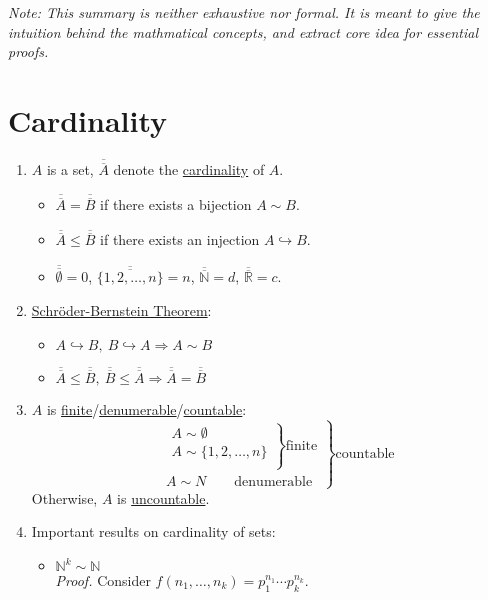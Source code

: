 \documentclass[%
 aip,
 jmp,%
 amsmath,amssymb,
 reprint,%
]{revtex4-1}
\def\R{{\mathbb R}}
\def\N{{\mathbb N}}
\renewenvironment{proof}{\color{gray}\footnotesize\emph{Proof.}}{}
\newcommand{\imply}{\Rightarrow}
\newcommand{\defn}[1]{\underline{#1}}
\newcommand{\card}[1]{\overline{\overline{#1}}}
\newcommand{\inject}{\hookrightarrow}
\begin{document}
\emph{Note: This summary is neither exhaustive nor formal.
It is meant to give the intuition behind the mathmatical concepts, and
extract core idea for essential proofs.}

\section{Cardinality}
\begin{enumerate}
  \item $A$ is a set, $\card{A}$ denote the \defn{cardinality} of $A$.
      \begin{itemize}
        \item $\card{A} = \card{B}$ if there exists a bijection $A \sim B$.
        \item $\card{A} \le \card{B}$ if there exists an injection $A \inject B$.
        \item $\card{\emptyset}=0$, $\card{\{1,2,\dots,n\}}=n$, $\card{\N}=d$, $\card{\R}=c$.
      \end{itemize}

  \item \defn{Schr\"oder-Bernstein Theorem}:
    \begin{itemize}
      \item $A \inject B,\ B \inject A \imply A \sim B$
      \item $\card{A} \le \card{B},\ \card{B} \le \card{A} \imply \card{A} = \card{B}$
    \end{itemize}

  \item $A$ is \defn{finite}/\defn{denumerable}/\defn{countable}:
  $$\left.
      \begin{align*}
         &\left.
          \begin{align*}
             A \sim \emptyset \\
             A \sim \{ 1,2,\dots,n \}\\
          \end{align*}
         \right\rbrace\text{finite}\\
          & A \sim N \qquad\textrm{denumerable}
      \end{align*}
  \right\rbrace\text{countable}$$
  Otherwise, $A$ is \defn{uncountable}.

  \item Important results on cardinality of sets:
    \begin{itemize}
      \item $\N^k \sim \N$ \\
        \begin{proof}
          Consider $f(n_1, \dots, n_k) = p_1^{n_1}\cdots p_k^{n_k}$.
        \end{proof}


\end{itemize}
\end{enumerate}
\end{document}

